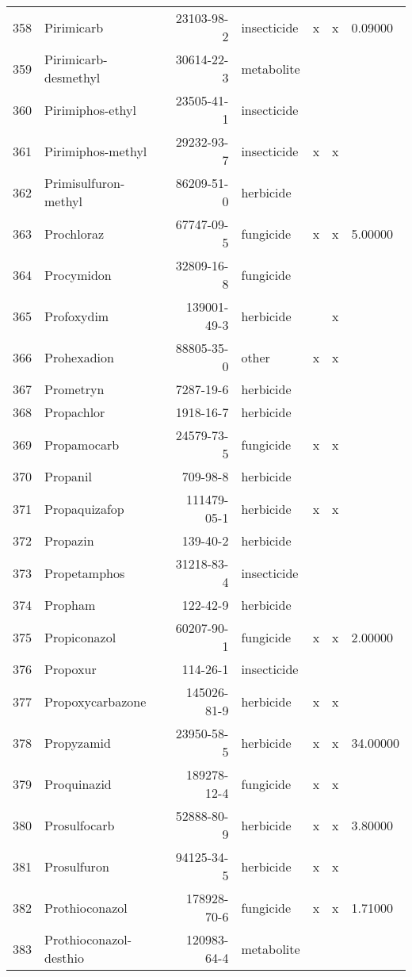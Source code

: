 \begin{longtable}{lp{4cm}rlp{1.3cm}p{1.3cm}p{1.5cm}}
  358 & Pirimicarb & 23103-98-2 & insecticide & x & x & 0.09000 \\ 
  359 & Pirimicarb-desmethyl & 30614-22-3 & metabolite &  &  &  \\ 
  360 & Pirimiphos-ethyl & 23505-41-1 & insecticide &  &  &  \\ 
  361 & Pirimiphos-methyl & 29232-93-7 & insecticide & x & x &  \\ 
  362 & Primisulfuron-methyl & 86209-51-0 & herbicide &  &  &  \\ 
  363 & Prochloraz & 67747-09-5 & fungicide & x & x & 5.00000 \\ 
  364 & Procymidon & 32809-16-8 & fungicide &  &  &  \\ 
  365 & Profoxydim & 139001-49-3 & herbicide &  & x &  \\ 
  366 & Prohexadion & 88805-35-0 & other & x & x &  \\ 
  367 & Prometryn & 7287-19-6 & herbicide &  &  &  \\ 
  368 & Propachlor & 1918-16-7 & herbicide &  &  &  \\ 
  369 & Propamocarb & 24579-73-5 & fungicide & x & x &  \\ 
  370 & Propanil & 709-98-8 & herbicide &  &  &  \\ 
  371 & Propaquizafop & 111479-05-1 & herbicide & x & x &  \\ 
  372 & Propazin & 139-40-2 & herbicide &  &  &  \\ 
  373 & Propetamphos & 31218-83-4 & insecticide &  &  &  \\ 
  374 & Propham & 122-42-9 & herbicide &  &  &  \\ 
  375 & Propiconazol & 60207-90-1 & fungicide & x & x & 2.00000 \\ 
  376 & Propoxur & 114-26-1 & insecticide &  &  &  \\ 
  377 & Propoxycarbazone & 145026-81-9 & herbicide & x & x &  \\ 
  378 & Propyzamid & 23950-58-5 & herbicide & x & x & 34.00000 \\ 
  379 & Proquinazid & 189278-12-4 & fungicide & x & x &  \\ 
  380 & Prosulfocarb & 52888-80-9 & herbicide & x & x & 3.80000 \\ 
  381 & Prosulfuron & 94125-34-5 & herbicide & x & x &  \\ 
  382 & Prothioconazol & 178928-70-6 & fungicide & x & x & 1.71000 \\ 
  383 & Prothioconazol-desthio & 120983-64-4 & metabolite &  &  &  \\ 

\end{longtable}
